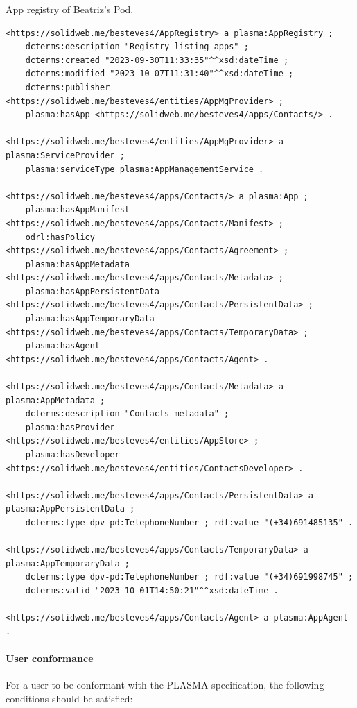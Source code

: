 \begin{listing}[htp]
\caption{App registry of Beatriz's Pod.}
\label{list:plasma_appregistry}
\begin{verbatim}
<https://solidweb.me/besteves4/AppRegistry> a plasma:AppRegistry ;
    dcterms:description "Registry listing apps" ;
    dcterms:created "2023-09-30T11:33:35"^^xsd:dateTime ;
    dcterms:modified "2023-10-07T11:31:40"^^xsd:dateTime ;
    dcterms:publisher <https://solidweb.me/besteves4/entities/AppMgProvider> ;
    plasma:hasApp <https://solidweb.me/besteves4/apps/Contacts/> .

<https://solidweb.me/besteves4/entities/AppMgProvider> a plasma:ServiceProvider ;
    plasma:serviceType plasma:AppManagementService .

<https://solidweb.me/besteves4/apps/Contacts/> a plasma:App ;
    plasma:hasAppManifest <https://solidweb.me/besteves4/apps/Contacts/Manifest> ;
    odrl:hasPolicy <https://solidweb.me/besteves4/apps/Contacts/Agreement> ;
    plasma:hasAppMetadata <https://solidweb.me/besteves4/apps/Contacts/Metadata> ;
    plasma:hasAppPersistentData <https://solidweb.me/besteves4/apps/Contacts/PersistentData> ;
    plasma:hasAppTemporaryData <https://solidweb.me/besteves4/apps/Contacts/TemporaryData> ;
    plasma:hasAgent <https://solidweb.me/besteves4/apps/Contacts/Agent> .

<https://solidweb.me/besteves4/apps/Contacts/Metadata> a plasma:AppMetadata ;
    dcterms:description "Contacts metadata" ;
    plasma:hasProvider <https://solidweb.me/besteves4/entities/AppStore> ;
    plasma:hasDeveloper <https://solidweb.me/besteves4/entities/ContactsDeveloper> .

<https://solidweb.me/besteves4/apps/Contacts/PersistentData> a plasma:AppPersistentData ;
    dcterms:type dpv-pd:TelephoneNumber ; rdf:value "(+34)691485135" .

<https://solidweb.me/besteves4/apps/Contacts/TemporaryData> a plasma:AppTemporaryData ;
    dcterms:type dpv-pd:TelephoneNumber ; rdf:value "(+34)691998745" ;
    dcterms:valid "2023-10-01T14:50:21"^^xsd:dateTime .

<https://solidweb.me/besteves4/apps/Contacts/Agent> a plasma:AppAgent .
\end{verbatim}
\end{listing}

\paragraph{User conformance}
For a user to be conformant with the PLASMA specification, the following conditions should be satisfied:

